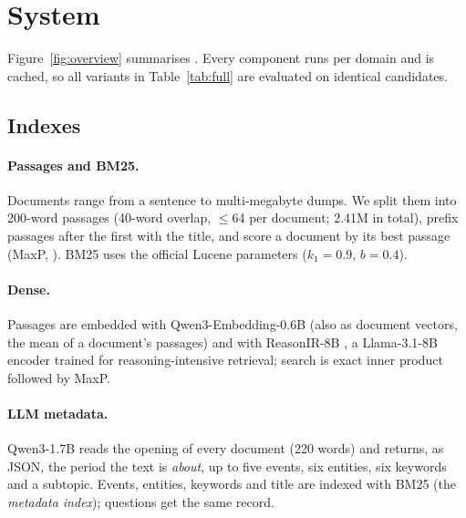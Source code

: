 \section{System}
\label{sec:system}


Figure~\ref{fig:overview} summarises \sys. Every component runs per domain and is cached, so all
variants in Table~\ref{tab:full} are evaluated on identical candidates.

\subsection{Indexes}
\label{sec:indexes}
\paragraph{Passages and BM25.} Documents range from a sentence to multi-megabyte dumps. We split
them into 200-word passages (40-word overlap, $\leq$64 per document; 2.41M in total), prefix
passages after the first with the title, and score a document by its best passage (MaxP,
\citealp{dai2019maxp}). BM25 uses the official Lucene parameters ($k_1{=}0.9$, $b{=}0.4$).

\paragraph{Dense.} Passages are embedded with Qwen3-Embedding-0.6B \citep{zhang2025qwen3emb}
(also as document vectors, the mean of a document's passages) and with ReasonIR-8B
\citep{shao2025reasonir}, a Llama-3.1-8B encoder trained for reasoning-intensive retrieval;
search is exact inner product followed by MaxP.

\paragraph{LLM metadata.} Qwen3-1.7B \citep{yang2025qwen3} reads the opening of every document
(220 words) and returns, as JSON, the period the text is \emph{about}, up to five events, six
entities, six keywords and a subtopic. Events, entities, keywords and title are indexed with BM25
(the \emph{metadata index}); questions get the same record.

